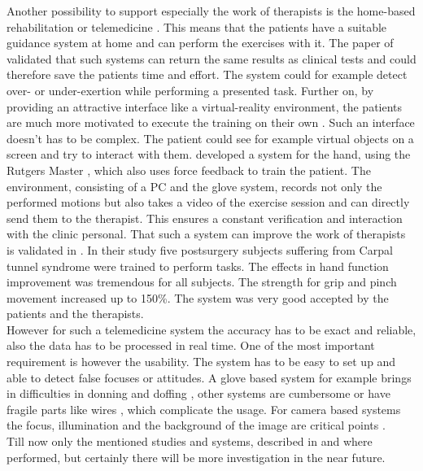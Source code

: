 {Another possibility to support especially the work of therapists is the home-based rehabilitation or telemedicine \cite{metcalf2013markerless}. This means that the patients have a suitable guidance system at home and can perform the exercises with it. The paper of \cite{durfee2007technical} validated that such systems can return the same results as clinical tests and could therefore save the patients time and effort. The system could for example detect over- or under-exertion while performing a presented task. Further on, by providing an attractive interface like a virtual-reality environment, the patients are much more motivated to execute the training on their own \cite{popescu2000virtual}. Such an interface doesn't has to be complex. The patient could see for example virtual objects on a screen and try to interact with them. \cite{popescu2000virtual} developed a system for the hand, using the Rutgers Master , which also uses force feedback to train the patient. The environment, consisting of a PC and the glove system, records not only the performed motions but also takes a video of the exercise session and can directly send them to the therapist. This ensures a constant verification and interaction with the clinic personal. That such a system can improve the work of therapists is validated in \cite{heuser2007telerehabilitation}. In their study five postsurgery subjects suffering from Carpal tunnel syndrome were trained to perform tasks. The effects in hand function improvement was tremendous for all subjects. The strength for grip and pinch movement increased up to 150\%. The system was very good accepted by the patients and the therapists.\\ 
However for such a telemedicine system the accuracy has to be exact and reliable, also the data has to be processed in real time. One of the most important requirement is however the usability. The system has to be easy to set up and able to detect false focuses or attitudes. A glove based system for example brings in difficulties in donning and doffing \cite{metcalf2013markerless}, other systems are cumbersome or have fragile parts like wires \cite{bouzit2002rutgers}, which complicate the usage. For camera based systems the focus, illumination and the background of the image are critical points \cite{ionescu2005dynamic}.\\
Till now only the mentioned studies and systems, described in \cite{heuser2007telerehabilitation} and \cite{popescu2000virtual} where performed, but certainly there will be more investigation in the near future.


}
